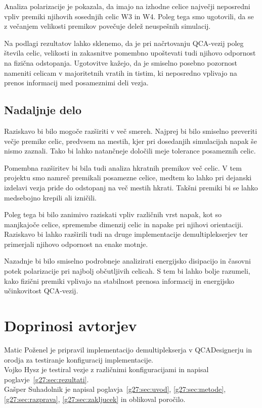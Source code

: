Analiza polarizacije je pokazala, da imajo na izhodne celice največji neposredni vpliv premiki njihovih sosednjih celic W3 in W4. Poleg tega smo ugotovili, da se z večanjem velikosti premikov povečuje delež neuspešnih simulacij.

Na podlagi rezultatov lahko sklenemo, da je pri načrtovanju QCA-vezij poleg števila celic, velikosti in zakasnitve pomembno upoštevati tudi njihovo odpornost na fizična odstopanja. Ugotovitve kažejo, da je smiselno posebno pozornost nameniti celicam v majoritetnih vratih in tistim, ki neposredno vplivajo na prenos informacij med posameznimi deli vezja.

\subsection{Nadaljnje delo}

Raziskavo bi bilo mogoče razširiti v več smereh. Najprej bi bilo smiselno preveriti večje premike celic, predvsem na mestih, kjer pri dosedanjih simulacijah napak še nismo zaznali. Tako bi lahko natančneje določili meje tolerance posameznih celic.

Pomembna razširitev bi bila tudi analiza hkratnih premikov več celic. V tem projektu smo namreč premikali posamezne celice, medtem ko lahko pri dejanski izdelavi vezja pride do odstopanj na več mestih hkrati. Takšni premiki bi se lahko medsebojno krepili ali izničili.

Poleg tega bi bilo zanimivo raziskati vpliv različnih vrst napak, kot so manjkajoče celice, spremembe dimenzij celic in napake pri njihovi orientaciji. Raziskavo bi lahko razširili tudi na druge implementacije demultiplekserjev ter primerjali njihovo odpornost na enake motnje.

Nazadnje bi bilo smiselno podrobneje analizirati energijsko disipacijo in časovni potek polarizacije pri najbolj občutljivih celicah. S tem bi lahko bolje razumeli, kako fizični premiki vplivajo na stabilnost prenosa informacij in energijsko učinkovitost QCA-vezij.


\section*{Doprinosi avtorjev}

Matic Poženel je pripravil implementacijo demultiplekserja v QCADesignerju in orodja za testiranje konfiguracij implementacije.\\
\noindent
Vojko Hysz je testiral vezje z različnimi konfiguracijami in napisal poglavje~\ref{g27:sec:rezultati}.\\
\noindent
Gašper Suhadolnik je napisal poglavja~\ref{g27:sec:uvod}, \ref{g27:sec:metode}, \ref{g27:sec:razprava}, \ref{g27:sec:zakljucek} in oblikoval poročilo.\\

